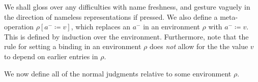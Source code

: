 \documentclass[final]{amsart}
\begin{document}

We shall gloss over any difficulties with name freshness, and gesture vaguely in the direction
of nameless representations if pressed. We also define a meta-operation $\rho[a^{-} \coloneqq v]$, which
replaces an $a^{-}$ in an environment $\rho$ with $a^{-} \coloneqq v$. This is defined by induction over
the environment. Furthermore, note that the rule for setting a binding in an environment $\rho$ does
\emph{not} allow for the the value $v$ to depend on earlier entries in $\rho$.

We now define all of the normal judgments relative to some environment $\rho$.

\end{document}

